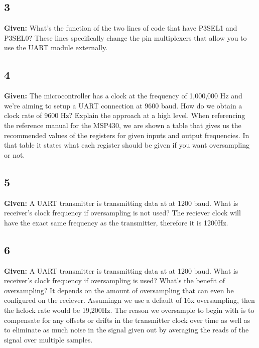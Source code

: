 \documentclass{article}
\begin{document}
\subsection{3}
\textbf{Given:} What’s the function of the two lines of code that have P3SEL1 and P3SEL0?
\newline
\newline
These lines specifically change the pin multiplexers that allow you to use the UART module externally.

\subsection{4}
\textbf{Given:} The microcontroller has a clock at the frequency of 1,000,000 Hz and we’re aiming to setup a UART connection at 9600 baud. How do we obtain a clock rate of 9600 Hz? Explain the approach at a high level.
\newline
\newline
When referencing the reference manual for the MSP430, we are shown a table that gives us the recommended values of the registers for given inputs and output frequencies. In that table it states what each register should be given if you want oversampling or not.

\subsection{5}
\textbf{Given:} A UART transmitter is transmitting data at at 1200 baud. What is receiver’s clock frequency if oversampling is not used?
\newline
\newline
The reciever clock will have the exact same frequency as the transmitter, therefore it is 1200Hz.

\pagebreak
\subsection{6}
\textbf{Given:} A UART transmitter is transmitting data at at 1200 baud. What is receiver’s clock frequency if oversampling is used? What’s the benefit of oversampling?
\newline
\newline
It depends on the amount of oversampling that can even be configured on the reciever. Assumingn we use a default of 16x oversampling, then the hclock rate would be 19,200Hz. The reason we oversample to begin with is to compensate for any offsets or drifts in the transmitter clock over time as well as to eliminate as much noise in the signal given out by averaging the reads of the signal over multiple samples.
\end{document}

